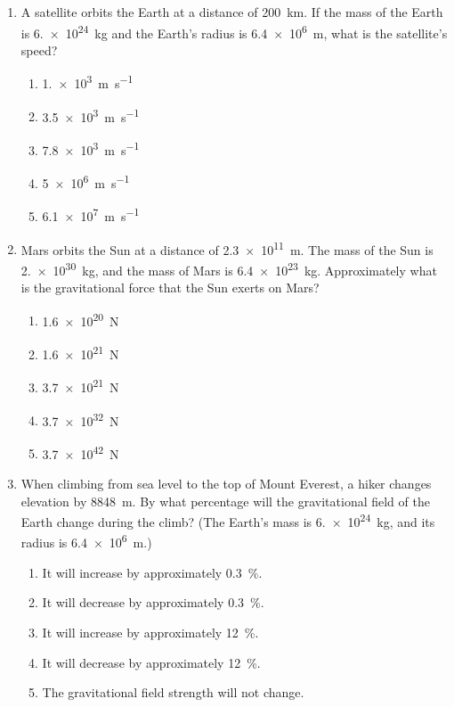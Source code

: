 \documentclass{../../../oss-classkick}
\begin{document}
\begin{multicols}{2}
\begin{enumerate}[leftmargin=18pt,resume]
  \item A satellite orbits the Earth at a distance of \SI{200}{\kilo\metre}. If
    the mass of the Earth is \SI{6.e24}{\kilo\gram} and the Earth's radius is
    \SI{6.4e6}{\metre}, what is the satellite's speed?
    \begin{enumerate}[nosep,leftmargin=18pt,label=(\Alph*)]
    \item\SI{1.e3}{\metre\per\second}
    \item\SI{3.5e3}{\metre\per\second}
    \item\SI{7.8e3}{\metre\per\second}
    \item\SI{5e6}{\metre\per\second}
    \item\SI{6.1e7}{\metre\per\second}
    \end{enumerate}
    
  \item Mars orbits the Sun at a distance of \SI{2.3e11}{\metre}. The mass of
    the Sun is \SI{2.e30}{\kilo\gram}, and the mass of Mars is
    \SI{6.4e23}{\kilo\gram}. Approximately what is the gravitational force that
    the Sun exerts on Mars?
    \begin{enumerate}[nosep,leftmargin=18pt,label=(\Alph*)]
    \item\SI{1.6e20}{\newton}
    \item\SI{1.6e21}{\newton}
    \item\SI{3.7e21}{\newton}
    \item\SI{3.7e32}{\newton}
    \item\SI{3.7e42}{\newton}
    \end{enumerate}
    
  \item When climbing from sea level to the top of Mount Everest, a hiker
    changes elevation by \SI{8848}{\metre}. By what percentage will the
    gravitational field of the Earth change during the climb? (The Earth's
    mass is \SI{6.e24}{\kilo\gram}, and its radius is \SI{6.4e6}{\metre}.)
    \begin{enumerate}[nosep,leftmargin=18pt,label=(\Alph*)]
    \item It will increase by approximately \SI{.3}{\percent}.
    \item It will decrease by approximately \SI{.3}{\percent}.
    \item It will increase by approximately \SI{12}{\percent}.
    \item It will decrease by approximately \SI{12}{\percent}.
    \item The gravitational field strength will not change.
    \end{enumerate}
    \vspace{.7in}
    

\end{enumerate}
\end{multicols}
\end{document}
